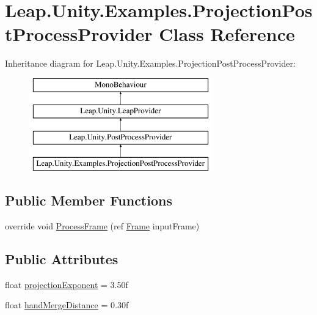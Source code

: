 \hypertarget{class_leap_1_1_unity_1_1_examples_1_1_projection_post_process_provider}{}\section{Leap.\+Unity.\+Examples.\+Projection\+Post\+Process\+Provider Class Reference}
\label{class_leap_1_1_unity_1_1_examples_1_1_projection_post_process_provider}
Inheritance diagram for Leap.\+Unity.\+Examples.\+Projection\+Post\+Process\+Provider\+:\begin{figure}[H]
\begin{center}
\leavevmode
\includegraphics[height=4.000000cm]{class_leap_1_1_unity_1_1_examples_1_1_projection_post_process_provider}
\end{center}
\end{figure}
\subsection*{Public Member Functions}
\begin{DoxyCompactItemize}
\item 
override void \mbox{\hyperlink{class_leap_1_1_unity_1_1_examples_1_1_projection_post_process_provider_a967ec672c9d36c7141ecdb3dbf63b36c}{Process\+Frame}} (ref \mbox{\hyperlink{class_leap_1_1_frame}{Frame}} input\+Frame)
\end{DoxyCompactItemize}
\subsection*{Public Attributes}
\begin{DoxyCompactItemize}
\item 
float \mbox{\hyperlink{class_leap_1_1_unity_1_1_examples_1_1_projection_post_process_provider_ab20b11dc9cb64bb7e1dfdef74727a4e3}{projection\+Exponent}} = 3.\+50f
\item 
float \mbox{\hyperlink{class_leap_1_1_unity_1_1_examples_1_1_projection_post_process_provider_a79847c705a1245acf42aa1376e88accf}{hand\+Merge\+Distance}} = 0.\+30f
\end{DoxyCompactItemize}
